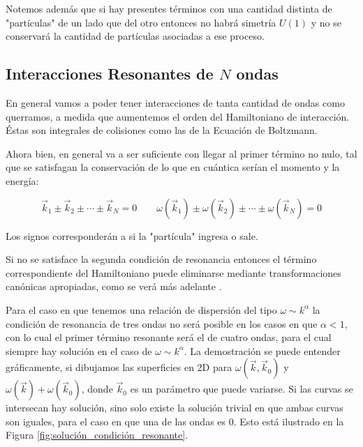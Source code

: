 Notemos además que si hay presentes términos con una cantidad distinta de "partículas" de un lado que del otro entonces no habrá simetría $U(1)$ y no se conservará la cantidad de partículas asociadas a ese proceso. 


\subsection*{Interacciones Resonantes de $N$ ondas} %
En general vamos a poder tener interacciones de tanta cantidad de ondas como querramos, a medida que aumentemos el orden del Hamiltoniano de interacción. Éstas son integrales de colisiones como las de la Ecuación de Boltzmann.

Ahora bien, en general va a ser suficiente con llegar al primer término no nulo, tal que se satisfagan la conservación de lo que en cuántica serían el momento y la energía: 

\begin{equation}
	\vec k_1 \pm \vec k_2 \pm \cdots \pm \vec k_N = 0 \qquad \omega(\vec k_1) \pm \omega(\vec k_2) \pm \cdots \pm \omega(\vec k_N) = 0
	\label{eq:condición_resonancia}
\end{equation}

Los signos corresponderán a si la "partícula" ingresa o sale. 

Si no se satisface la segunda condición de resonancia entonces el término correspondiente del Hamiltoniano puede eliminarse mediante transformaciones canónicas apropiadas, como se verá más adelante \cite{zakharovKolmogorovSpectraTurbulence1992}.

Para el caso en que tenemos una relación de dispersión del tipo $\omega\sim k^{\alpha}$ la condición de resonancia de tres ondas no será posible en los casos en que $\alpha<1$, con lo cual el primer término resonante será el de cuatro ondas, para el cual siempre hay solución en el caso de $\omega\sim k^{\alpha}$. La demostración se puede entender gráficamente, si dibujamos las superficies en 2D para $\omega(\vec k, \vec k_0)$ y $\omega(\vec k) + \omega(\vec k_0)$, donde $\vec k_0$ es un parámetro que puede variarse. Si las curvas se intersecan hay solución, sino solo existe la solución trivial en que ambas curvas son iguales, para el caso en que una de las ondas es 0. Esto está ilustrado en la Figura \ref{fig:solución_condición_resonante}. %

